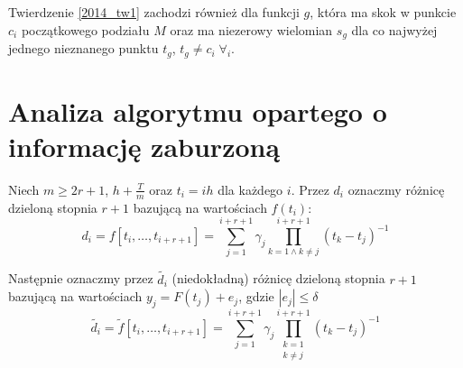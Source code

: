 \documentclass[oik, pdftex, robocza, man]{mgrwms}
\begin{document}
    \begin{uw}
        Twierdzenie \ref{2014_tw1} zachodzi również dla funkcji $g$, która ma skok w punkcie $c_{i}$ początkowego podziału $M$ oraz ma niezerowy wielomian $s_{g}$ dla co najwyżej jednego nieznanego punktu $t_{g}$, $t_{g} \neq c_{i} \; \forall_{i}$.
    \end{uw}


    \section{Analiza algorytmu opartego o informację zaburzoną}

    Niech $m \geq 2r + 1$, $h + \frac{T}{m}$ oraz $t_{i} = ih$ dla każdego $i$. Przez $d_{i}$ oznaczmy różnicę dzieloną stopnia $r+1$ bazującą na wartościach $f(t_{i})$:
    \begin{equation*}
        d_{i} = f[t_{i}, \dots, t_{i+r+1}] = \sum_{j = 1}^{i+r+1} \gamma_{j} \prod_{k=1 \land k \neq j}^{i+r+1}(t_{k}-t_{j})^{-1}
    \end{equation*}

    Następnie oznaczmy przez $\tilde{d_i}$ (niedokładną) różnicę dzieloną stopnia $r+1$ bazującą na wartościach $y_{j} = F(t_{j}) + e_{j}$, gdzie $|e_{j}| \leq \delta$
    \begin{equation*}
        \tilde{d_{i}} = \tilde{f}[t_{i}, \dots, t_{i+r+1}] = \sum_{j = 1}^{i+r+1} \gamma_{j} \prod_{\substack{k=1 \\ k \neq j}}^{i+r+1}(t_{k}-t_{j})^{-1}
    \end{equation*}
\end{document}
